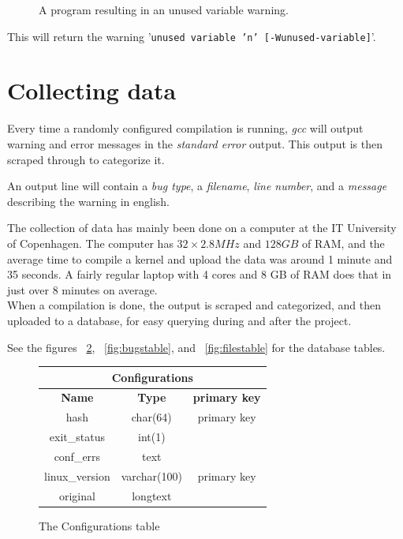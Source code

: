 \documentclass[a4paper,11pt]{report}
\newcommand{\figa}{
    \begin{figure}[!htpb]
    \centering
}
\newcommand{\figb}[2]{
    \caption{#1}
    \label{#2}
    \end{figure}
}
\begin{document}
\figa
    
\figb{A program resulting in an unused variable warning.}{lst:unusedvar}

This will return the warning '\texttt{unused variable 'n' [-Wunused-variable]}'.



\section{Collecting data}

Every time a randomly configured compilation is running, \emph{gcc} will 
output warning and error messages in the \emph{standard error} output. This 
output is then scraped through to categorize it.

An output line will contain a \emph{bug type}, a \emph{filename}, \emph{line 
number}, and a \emph{message} describing the warning in english.


The collection of data has mainly been done on a computer at the IT University 
of Copenhagen. The computer has $32\times2.8 MHz$ and $128 GB$ of RAM, and the 
average time to compile a kernel and upload the data was around 1 minute and 35 
seconds. A fairly regular laptop with 4 cores and 8 GB of RAM does that in just 
over 8 minutes on average. 
\\


When a compilation is done, the output is scraped and categorized, and then 
uploaded to a database, for easy querying during and after the project. 

See the figures ~\ref{fig:conftable}, ~\ref{fig:bugstable}, and 
~\ref{fig:filestable} for the database tables.


\figa
    \begin{tabular}{c|c|c}
        \hline 
        \hline
        \multicolumn{3}{c}{\textbf{Configurations}} \\
        \hline
        \textbf{Name} & \textbf{Type} &\textbf{primary key} \\
        \hline
        hash & char(64) & primary key \\
        exit\_status & int(1) \\
        conf\_errs & text \\
        linux\_version & varchar(100) & primary key \\
        original & longtext \\
        \hline
        \hline
    \end{tabular}
\figb{The Configurations table}{fig:conftable}
\end{document}
